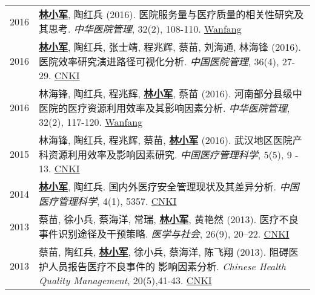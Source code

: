 \documentclass{resume}
\begin{document}
\begin{longtable}{r p{14cm}}
2016 & \underline{\textbf{林小军}}, 陶红兵 (2016). 医院服务量与医疗质量的相关性研究及其思考. \emph{ 中华医院管理}, 32(2), 108-110. \href{http://www.wanfangdata.com.cn/details/detail.do?_type=perio&id=zhyygl201602010}{Wanfang}\\
2016 & \underline{\textbf{林小军}}, 陶红兵, 张士靖, 程兆辉, 蔡苗, 刘海通, 林海锋 (2016). 医院效率研究演进路径可视化分析. \emph{ 中国医院管理}, 36(4), 27-29. \href{http://kns.cnki.net/KCMS/detail/detail.aspx?dbcode=CJFQ&dbname=CJFDLAST2016&filename=YYGL201604015&v=MjM5ODRSTEtlWnVadEZpRG5VNy9MUERUTVlyRzRIOWZNcTQ5RVlZUjhlWDFMdXhZUzdEaDFUM3FUcldNMUZyQ1U=}{CNKI}\\
2016 & 林海锋, 陶红兵, 程兆辉, \underline{\textbf{林小军}}, 蔡苗 (2016). 河南部分县级中医院的医疗资源利用效率及其影响因素分析. \emph{ 中华医院管理}, 32(2), 117-120. \href{http://www.wanfangdata.com.cn/details/detail.do?_type=perio&id=zhyygl201602013}{Wanfang}\\
2015 & 林海锋, 陶红兵, 程兆辉, 蔡苗, \underline{\textbf{林小军}} (2016). 武汉地区医院产科资源利用效率及影响因素研究. \emph{ 中国医疗管理科学}, 5(5), 9 - 13. \href{http://kns.cnki.net/KCMS/detail/detail.aspx?dbcode=CJFQ&dbname=CJFDLAST2015&filename=YLGL201505004&v=MjkxODIxTHV4WVM3RGgxVDNxVHJXTTFGckNVUkxLZVp1WnNGaXZtVkx2QVBDSE1Zckc0SDlUTXFvOUZZSVI4ZVg=}{CNKI}\\
2014 & \underline{\textbf{林小军}}, 陶红兵. 国内外医疗安全管理现状及其差异分析. \emph{ 中国医疗管理科学}, 4(1), 5357. \href{http://kns.cnki.net/KCMS/detail/detail.aspx?dbcode=CJFQ&dbname=CJFD2014&filename=YLGL201401019&v=MjQzMzVUcldNMUZyQ1VSTEtlWnVadEZpRG5WNy9JUENITVlyRzRIOVhNcm85RWJZUjhlWDFMdXhZUzdEaDFUM3E=}{CNKI}\\
2013 & 蔡苗, 徐小兵, 蔡海洋, 常瑞, \underline{\textbf{林小军}}, 黄艳然 (2013). 医疗不良事件识别途径及干预策略. \emph{ 医学与社会}, 26(9), 20–22. \href{http://kns.cnki.net/KCMS/detail/detail.aspx?dbcode=CJFQ&dbname=CJFDHIS2&filename=YXSH201309007&v=MDAwNDFyQ1VSTEtlWnVac0Zpdm1XcnZOUERYWVpyRzRIOUxNcG85Rlk0UjhlWDFMdXhZUzdEaDFUM3FUcldNMUY=}{CNKI}\\
2013 & 蔡苗, 陶红兵, \underline{\textbf{林小军}}, 徐小兵, 蔡海洋, 陈飞翔 (2013). 阻碍医护人员报告医疗不良事件的 影响因素分析. \emph{Chinese Health Quality Management}, 20(5),41-43. \href{http://kns.cnki.net/KCMS/detail/detail.aspx?dbcode=CJFQ&dbname=CJFDHIS2&filename=WSJG201305024&v=Mjc4MDIxTHV4WVM3RGgxVDNxVHJXTTFGckNVUkxLZVp1WnNGaXZuVXJ6Tk1qN0JhYkc0SDlMTXFvOUhZSVI4ZVg=}{CNKI}\\	
\end{longtable}
\end{document}
